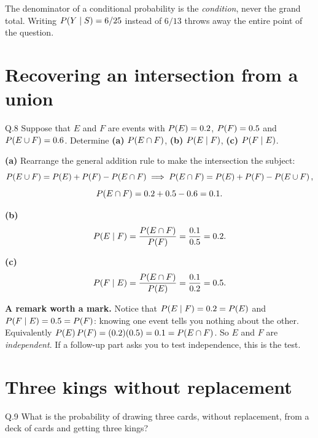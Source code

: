 \begin{pitfall}
The denominator of a conditional probability is the \emph{condition}, never the
grand total. Writing $P\!\left(Y\mid S\right)=6/25$ instead of $6/13$ throws away the
entire point of the question.
\end{pitfall}

\section{Recovering an intersection from a union}

\begin{question}{Q.8}
Suppose that $E$ and $F$ are events with $P\!\left(E\right)=0.2$, $P\!\left(F\right)=0.5$ and
$P\!\left(E\cup F\right)=0.6$. Determine
\textbf{(a)} $P\!\left(E\cap F\right)$, \textbf{(b)} $P\!\left(E\mid F\right)$,
\textbf{(c)} $P\!\left(F\mid E\right)$.
\end{question}

\begin{solution}
\textbf{(a)} Rearrange the general addition rule to make the intersection the
subject:
\[
\prob{E\cup F}=\prob{E}+\prob{F}-\prob{E\cap F}
\;\Longrightarrow\;
\prob{E\cap F}=\prob{E}+\prob{F}-\prob{E\cup F},
\]
\[
P\!\left(E\cap F\right)=0.2+0.5-0.6=0.1 .
\]

\textbf{(b)} \[
P\!\left(E\mid F\right)=\frac{P\!\left(E\cap F\right)}{P\!\left(F\right)}=\frac{0.1}{0.5}=0.2 .
\]

\textbf{(c)} \[
P\!\left(F\mid E\right)=\frac{P\!\left(E\cap F\right)}{P\!\left(E\right)}=\frac{0.1}{0.2}=0.5 .
\]

\medskip
\textbf{A remark worth a mark.} Notice that $P\!\left(E\mid F\right)=0.2=P\!\left(E\right)$ and
$P\!\left(F\mid E\right)=0.5=P\!\left(F\right)$: knowing one event tells you nothing about the
other. Equivalently $P\!\left(E\right)P\!\left(F\right)=(0.2)(0.5)=0.1=P\!\left(E\cap F\right)$. So $E$
and $F$ are \emph{independent}. If a follow-up part asks you to test
independence, this is the test.

\end{solution}

\section{Three kings without replacement}

\begin{question}{Q.9}
What is the probability of drawing three cards, without replacement, from a
deck of cards and getting three kings?
\end{question}

